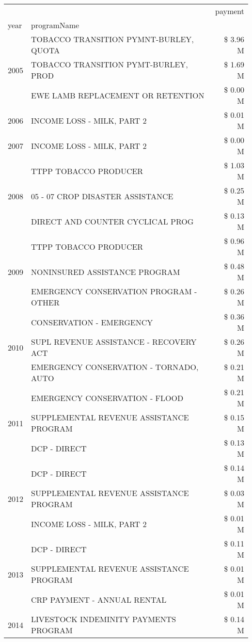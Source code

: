\begin{tabular}{llr}
\toprule
 &  & payment \\
year & programName &  \\
\midrule
\multirow[t]{3}{*}{2005} & TOBACCO TRANSITION PYMNT-BURLEY, QUOTA & \$ 3.96 M \\
 & TOBACCO TRANSITION PYMT-BURLEY, PROD & \$ 1.69 M \\
 & EWE LAMB REPLACEMENT OR RETENTION & \$ 0.00 M \\
\cline{1-3}
2006 & INCOME LOSS - MILK, PART 2 & \$ 0.01 M \\
\cline{1-3}
2007 & INCOME LOSS - MILK, PART 2 & \$ 0.00 M \\
\cline{1-3}
\multirow[t]{3}{*}{2008} & TTPP TOBACCO PRODUCER & \$ 1.03 M \\
 & 05 - 07 CROP DISASTER ASSISTANCE & \$ 0.25 M \\
 & DIRECT AND COUNTER CYCLICAL PROG & \$ 0.13 M \\
\cline{1-3}
\multirow[t]{3}{*}{2009} & TTPP TOBACCO PRODUCER & \$ 0.96 M \\
 & NONINSURED ASSISTANCE PROGRAM & \$ 0.48 M \\
 & EMERGENCY CONSERVATION PROGRAM - OTHER & \$ 0.26 M \\
\cline{1-3}
\multirow[t]{3}{*}{2010} & CONSERVATION - EMERGENCY & \$ 0.36 M \\
 & SUPL REVENUE ASSISTANCE - RECOVERY ACT & \$ 0.26 M \\
 & EMERGENCY CONSERVATION - TORNADO, AUTO & \$ 0.21 M \\
\cline{1-3}
\multirow[t]{3}{*}{2011} & EMERGENCY CONSERVATION - FLOOD & \$ 0.21 M \\
 & SUPPLEMENTAL REVENUE ASSISTANCE PROGRAM & \$ 0.15 M \\
 & DCP - DIRECT & \$ 0.13 M \\
\cline{1-3}
\multirow[t]{3}{*}{2012} & DCP - DIRECT & \$ 0.14 M \\
 & SUPPLEMENTAL REVENUE ASSISTANCE PROGRAM & \$ 0.03 M \\
 & INCOME LOSS - MILK, PART 2 & \$ 0.01 M \\
\cline{1-3}
\multirow[t]{3}{*}{2013} & DCP - DIRECT & \$ 0.11 M \\
 & SUPPLEMENTAL REVENUE ASSISTANCE PROGRAM & \$ 0.01 M \\
 & CRP PAYMENT - ANNUAL RENTAL & \$ 0.01 M \\
\cline{1-3}
\multirow[t]{3}{*}{2014} & LIVESTOCK INDEMINITY PAYMENTS PROGRAM & \$ 0.14 M \\

\end{tabular}
